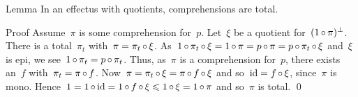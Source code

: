 \documentclass[b]{subfiles}
\begin{document}
\begin{parsec}
\begin{point}{Lemma}%
In an effectus with quotients, comprehensions are total.
\begin{point}{Proof}%
Assume~$\pi$ is some comprehension for~$p$.
Let~$\xi$ be a quotient for~$(1 \mathop{\circ} \pi)^\perp$.
There is a total~$\pi_t$ with~$\pi = \pi_t \mathop{\circ} \xi$.
As~$ 1 \mathop{\circ} \pi_t \mathop{\circ} \xi
        = 1 \mathop{\circ} \pi
        = p \mathop{\circ} \pi
        = p \mathop{\circ} \pi_t \mathop{\circ} \xi$
        and~$\xi$ is epi,
        we see~$1 \mathop{\circ} \pi_t = p \mathop{\circ} \pi_t$.
Thus, as~$\pi$ is a comprehension for~$p$,
    there exists an~$f$ with~$\pi_t = \pi \mathop{\circ} f$.
Now~$\pi = \pi_t \mathop{\circ} \xi = \pi \mathop{\circ} f \mathop{\circ} \xi$
    and so~$\operatorname{id} = f \mathop{\circ} \xi$, since~$\pi$ is mono.
Hence~$1 = 1 \mathop{\circ} \operatorname{id} =1 \mathop{\circ} f \mathop{\circ} \xi \leqslant 1 \mathop{\circ} \xi = 1 \mathop{\circ} \pi$
    and so~$\pi$ is total. \qed
\end{point}
\end{point}
\end{parsec}
\end{document}
